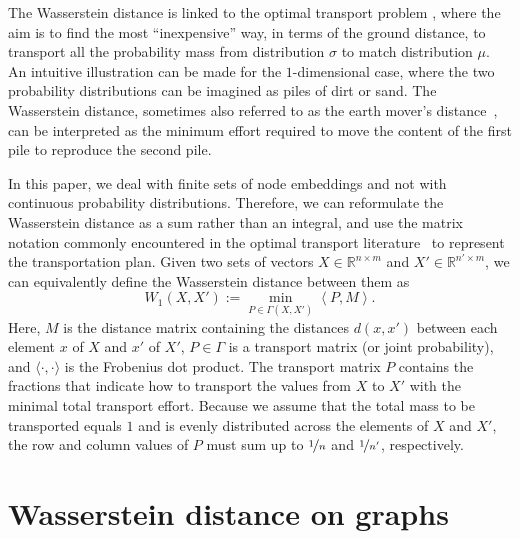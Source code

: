 \documentclass{article}
\begin{document}
The Wasserstein distance is linked to the optimal transport problem \citep{villani2008optimal}, where the aim is to find the most ``inexpensive'' way, in terms of the ground distance, to transport all the probability mass from distribution $\sigma$ to match distribution $\mu$. 
An intuitive illustration can be made for the $1$-dimensional case, where the two probability distributions can be imagined as piles of dirt or sand. The Wasserstein distance, sometimes also referred to as the earth mover's distance~\citep{rubner2000earth}, can be interpreted as the minimum effort required to move the content of the first pile to reproduce the second pile.

In this paper, we deal with finite sets of node embeddings and not with continuous probability distributions. Therefore, we can reformulate the Wasserstein distance as a sum rather than an integral, and use the matrix notation commonly encountered in the optimal transport literature~\citep{rubner2000earth} to represent the transportation plan.
Given two sets of vectors $X \in \mathbb{R}^{n \times m}$ and $X'\in \mathbb{R}^{n' \times m}$, we can equivalently define the Wasserstein distance between them as
\begin{equation}
\label{eq:wassdiscreteformulation}
    W_1(X,X') :=  \min_{P \in \Gamma(X, X')} \left \langle P, M\right \rangle.
\end{equation}
Here, $M$ is the distance matrix containing the distances $d(x,x')$ between each element $x$ of $X$ and $x'$ of $X'$,  $P \in \Gamma$ is a transport matrix (or joint probability), and $\langle \cdot, \cdot \rangle$ is the Frobenius dot product. The transport matrix $P$ contains the fractions that indicate how to transport the values from $X$ to $X'$ with the minimal total transport effort. Because we assume that the total mass to be transported equals $1$ and is evenly distributed across the elements of $X$ and $X'$, the row and column values of $P$ must sum up to $\nicefrac{1}{n}$ and $\nicefrac{1}{n'}$, respectively.




\section{Wasserstein distance on graphs}
\label{sec:GWD}
\end{document}
